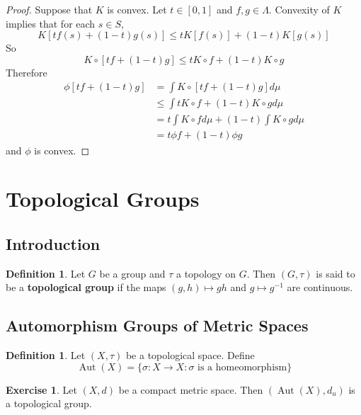 \documentclass[12pt]{amsart}
\theoremstyle{definition}
\newtheorem{defn}[definition]{Definition}
\newtheorem{ex}[definition]{Exercise}
\newcommand{\Lam}{\Lambda}
\newcommand{\sig}{\sigma}
\newcommand{\ui}{[0,1]}
\DeclareMathOperator{\Aut}{Aut}
\newcommand{\lex}[1]{\label{ex:#1}}
\newcommand{\ld}[1]{\label{defn:#1}}
\begin{document}
	\begin{proof}
	Suppose that $K$ is convex. Let $t \in \ui$ and $f, g \in \Lam$. Convexity of $K$ implies that for each $s \in S$, $$K[tf(s) + (1-t)g(s)] \leq tK[f(s)] + (1-t)K[g(s)]$$ So $$K \circ [tf +(1-t)g] \leq t K \circ f + (1-t) K \circ g$$
	Therefore 
	\begin{align*}
	\phi[tf + (1-t) g]
	&= \int K \circ [tf +(1-t)g] d \mu \\
	& \leq  \int t K \circ f + (1-t) K \circ g d \mu \\
	&= t \int K \circ f d\mu + (1-t) \int K \circ g d \mu \\
	&= t \phi f + (1-t) \phi g
	\end{align*}
	and $\phi$ is convex.
	\end{proof}
	
	\newpage
	
	
	
	
	
	
	
	
	
	
	
	
	
	
	
	
	
	
	\newpage
	\section{Topological Groups}
	\subsection{Introduction}
	
	\begin{defn} \ld{}
	Let $G$ be a group and $\tau$ a topology on $G$. Then $(G, \tau)$ is said to be a \textbf{topological group} if the maps $(g,h) \mapsto gh$ and $g \mapsto g^{-1}$ are continuous. 
	\end{defn}	
	
	\subsection{Automorphism Groups of Metric Spaces}
	
	\begin{defn} \ld{}
	Let $(X, \tau)$ be a topological space. Define $$\Aut(X) = \{\sig:X\rightarrow X: \sig \text{ is a homeomorphism} \}$$ 
	\end{defn}	
	
	\begin{ex} \lex{}
	Let $(X, d)$ be a compact metric space. Then $(\Aut(X), d_{u} )$ is a topological group.
	\end{ex}
	
\end{document}
